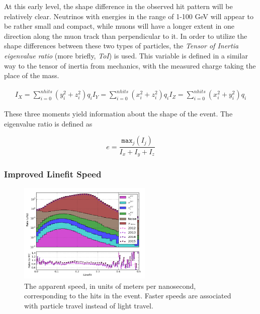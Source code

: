 At this early level, the shape difference in the observed hit pattern will be relatively clear.
Neutrinos with energies in the range of 1-100 GeV will appear to be rather small and compact, while muons will have a longer extent in one direction along the muon track than perpendicular to it.
In order to utilize the shape differences between these two types of particles, the \emph{Tensor of Inertia eigenvalue ratio} (more briefly, \emph{ToI}) is used.
This variable is defined in a similar way to the tensor of inertia from mechanics, with the measured charge taking the place of the mass.

\begin{eqnarray}
	I_{X} = \sum_{i=0}^{nhits}(y_i^2 + z_i^2)q_i	
	I_{Y} = \sum_{i=0}^{nhits}(x_i^2 + z_i^2)q_i
	I_{Z} = \sum_{i=0}^{nhits}(x_i^2 + y_i^2)q_i
\end{eqnarray}

These three moments yield information about the shape of the event.
The eigenvalue ratio is defined as 

\begin{equation}
	e = \frac{\mathtt{max}_j(I_j)}{I_{x}+I_{y}+I_{z}}
\end{equation}


\subsubsection{Improved Linefit Speed}
\begin{figure}[h]
	\centering
		\includegraphics[width=2.5in]{iLineFit_Log.png}
		\caption[The improvedLineFit Speed]{The apparent speed, in units of meters per nanosecond, corresponding to the hits in the event. Faster speeds are associated with particle travel instead of light travel.}
	\label{fig:ilinefit_log}
\end{figure}



